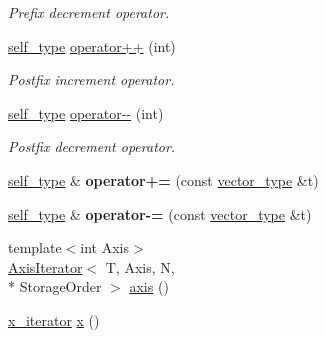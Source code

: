 \begin{DoxyCompactItemize}
\begin{DoxyCompactList}\small\item\em Prefix decrement operator. \end{DoxyCompactList}\item 
\hypertarget{class_d_o_1_1_locator_a39f7c37604fd9845ff487b36b6f88602}{\hyperlink{class_d_o_1_1_locator_a2b4e7bf0649f420e5db026e79ac499be}{self\-\_\-type} \hyperlink{class_d_o_1_1_locator_a39f7c37604fd9845ff487b36b6f88602}{operator++} (int)}\label{class_d_o_1_1_locator_a39f7c37604fd9845ff487b36b6f88602}

\begin{DoxyCompactList}\small\item\em Postfix increment operator. \end{DoxyCompactList}\item 
\hypertarget{class_d_o_1_1_locator_ac8142815f977b8411faf27f7b8d804b3}{\hyperlink{class_d_o_1_1_locator_a2b4e7bf0649f420e5db026e79ac499be}{self\-\_\-type} \hyperlink{class_d_o_1_1_locator_ac8142815f977b8411faf27f7b8d804b3}{operator-\/-\/} (int)}\label{class_d_o_1_1_locator_ac8142815f977b8411faf27f7b8d804b3}

\begin{DoxyCompactList}\small\item\em Postfix decrement operator. \end{DoxyCompactList}\item 
\hypertarget{class_d_o_1_1_locator_a6c0808c388428f119495e5ba1d9fbbed}{\hyperlink{class_d_o_1_1_locator_a2b4e7bf0649f420e5db026e79ac499be}{self\-\_\-type} \& {\bfseries operator+=} (const \hyperlink{class_d_o_1_1_locator_aacf98e49e90f9aeead0ff8885fae3ac7}{vector\-\_\-type} \&t)}\label{class_d_o_1_1_locator_a6c0808c388428f119495e5ba1d9fbbed}

\item 
\hypertarget{class_d_o_1_1_locator_afced994f988f5373b78393cab267065a}{\hyperlink{class_d_o_1_1_locator_a2b4e7bf0649f420e5db026e79ac499be}{self\-\_\-type} \& {\bfseries operator-\/=} (const \hyperlink{class_d_o_1_1_locator_aacf98e49e90f9aeead0ff8885fae3ac7}{vector\-\_\-type} \&t)}\label{class_d_o_1_1_locator_afced994f988f5373b78393cab267065a}

\item 
{\footnotesize template$<$int Axis$>$ }\\\hyperlink{class_d_o_1_1_axis_iterator}{Axis\-Iterator}$<$ T, Axis, N, \\*
Storage\-Order $>$ \hyperlink{class_d_o_1_1_locator_a2e106e539d6ba7366e07cc4ae130b29e}{axis} ()
\item 
\hypertarget{class_d_o_1_1_locator_a73957d210565fc1dcf018c748cc7942c}{\hyperlink{class_d_o_1_1_locator_ad4305c73fecc71059d7f201539322941}{x\-\_\-iterator} \hyperlink{class_d_o_1_1_locator_a73957d210565fc1dcf018c748cc7942c}{x} ()}\label{class_d_o_1_1_locator_a73957d210565fc1dcf018c748cc7942c}


\end{DoxyCompactItemize}
